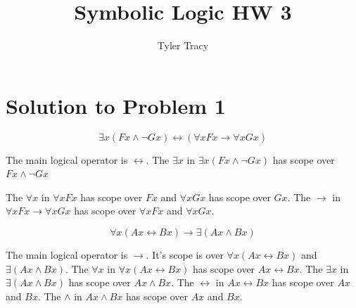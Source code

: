 \documentclass[12pt]{article}
\title{Symbolic Logic HW 3}
\author{Tyler Tracy}
\begin{document}
\maketitle

\section*{Solution to Problem 1}

\[\exists x(Fx \land \neg Gx) \leftrightarrow (\forall x Fx \rightarrow \forall xGx)\]

\begin{figure}[h]
\centering
{}
\end{figure}

The main logical operator is $\leftrightarrow$. 
The $\exists x$ in $\exists x (Fx \land \neg Gx)$ has scope over $Fx \land \neg Gx$

The $\forall x$ in $\forall x Fx$ has scope over $Fx$ and $\forall x Gx$ has scope over $Gx$.
The $\rightarrow$ in $\forall x Fx \rightarrow \forall xGx$ has scope over $\forall x Fx$ and $\forall xGx$.


\[ \forall x (Ax \leftrightarrow Bx) \rightarrow \exists (Ax \land Bx) \]

\begin{center}
\end{center}


The main logical operator is $\rightarrow$. It's scope is over $\forall x (Ax \leftrightarrow Bx)$ and $\exists (Ax \land Bx)$.
The $\forall x$ in $\forall x (Ax \leftrightarrow Bx)$ has scope over $Ax \leftrightarrow Bx$.
The $\exists x$ in $\exists (Ax \land Bx)$ has scope over $Ax \land Bx$.
The $\leftrightarrow$ in $Ax \leftrightarrow Bx$ has scope over $Ax$ and $Bx$.
The $\land$ in $Ax \land Bx$ has scope over $Ax$ and $Bx$.
\end{document}
